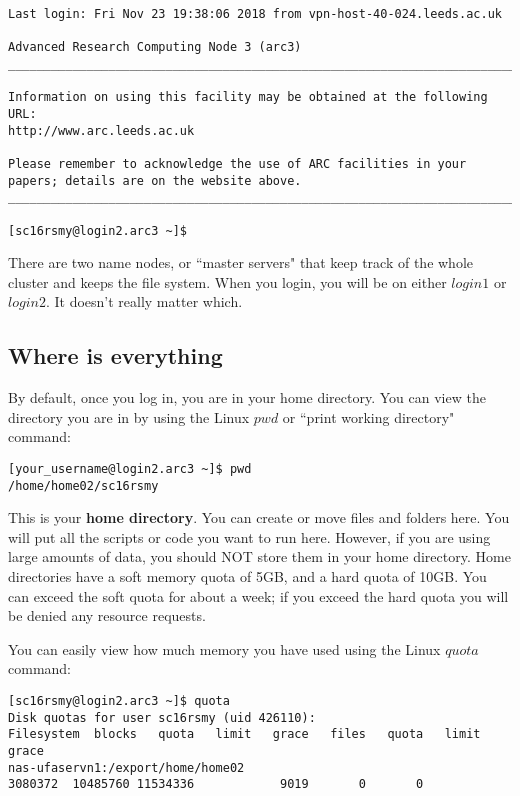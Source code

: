 \documentclass[]{article}
\begin{document}
\begin{lstlisting}
Last login: Fri Nov 23 19:38:06 2018 from vpn-host-40-024.leeds.ac.uk

Advanced Research Computing Node 3 (arc3)
________________________________________________________________________

Information on using this facility may be obtained at the following URL:
http://www.arc.leeds.ac.uk

Please remember to acknowledge the use of ARC facilities in your
papers; details are on the website above.
________________________________________________________________________

[sc16rsmy@login2.arc3 ~]$ 
\end{lstlisting}

There are two name nodes, or ``master servers" that keep track of the whole cluster and keeps the file system. When you login, you will be on either \(login1\) or \(login2\). It doesn't really matter which.

\subsection{Where is everything}

By default, once you log in, you are in your home directory. You can view the directory you are in by using the Linux \(pwd\) or ``print working directory" command:

\begin{lstlisting}
[your_username@login2.arc3 ~]$ pwd
/home/home02/sc16rsmy
\end{lstlisting}

This is your \textbf{home directory}. You can create or move files and folders here. You will put all the scripts or code you want to run here. However, if you are using large amounts of data, you should NOT store them in your home directory. Home directories have a soft memory quota of 5GB, and a hard quota of 10GB. You can exceed the soft quota for about a week; if you exceed the hard quota you will be denied any resource requests.

You can easily view how much memory you have used using the Linux \(quota\) command:

\begin{lstlisting}
[sc16rsmy@login2.arc3 ~]$ quota
Disk quotas for user sc16rsmy (uid 426110): 
Filesystem  blocks   quota   limit   grace   files   quota   limit   grace
nas-ufaservn1:/export/home/home02
3080372  10485760 11534336            9019       0       0        
\end{lstlisting}
\end{document}
